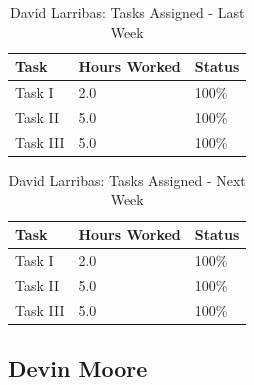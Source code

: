 \documentclass[12pt,journal]{IEEEtran}
\begin{document}
	\begin{table}[H]
	\renewcommand{\arraystretch}{1.3}
		\caption{David Larribas: Tasks Assigned - Last Week}
		
		\label{Summary of David Larribas' activities: last week}
		
		\centering
		\begin{tabular}{p{5cm}|p{1cm}|p{1cm}}
		\hline
		\bfseries 	Task		 	              				& \bfseries Hours Worked	& \bfseries Status	\\
		\hline\hline
                Task I 					 	            			& 2.0                   	& 100\%             \\
                Task II 														& 5.0                   	& 100\%             \\
                Task III														& 5.0                   	& 100\%             \\
		\hline
		\end{tabular}
	\end{table}

	\begin{table}[H]
	\renewcommand{\arraystretch}{1.3}
		\caption{David Larribas: Tasks Assigned - Next Week}
		
		\label{Summary of David Larribas' activites: this week}
		
		\centering
		\begin{tabular}{p{5cm}|p{1cm}|p{1cm}}
		\hline
		\bfseries 	Task		 	                         	 & \bfseries Hours Worked	& \bfseries Status	\\
		\hline\hline
					      Task I 					 	            			& 2.0                   	& 100\%             \\
                Task II 														& 5.0                   	& 100\%             \\
                Task III														& 5.0                   	& 100\%             \\
                    \hline
		\end{tabular}
	\end{table}   

\subsection{Devin Moore}
\end{document}
